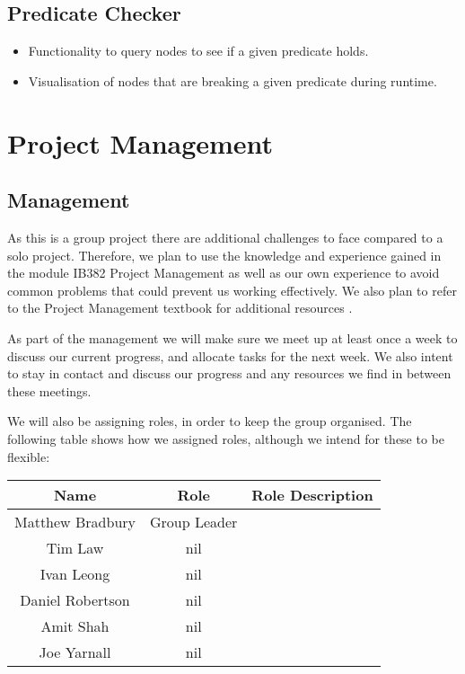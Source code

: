 \documentclass[a4paper]{article}
\begin{document}
\subsection{Predicate Checker}
\begin{itemize}
	\item Functionality to query nodes to see if a given predicate holds.
	\item Visualisation of nodes that are breaking a given predicate during runtime.
\end{itemize}



\section{Project Management}

\subsection{Management}

As this is a group project there are additional challenges to face compared to a solo project. Therefore, we plan to use the knowledge and experience gained in the module IB382 Project Management \cite{?} as well as our own experience to avoid common problems that could prevent us working effectively. We also plan to refer to the Project Management textbook for additional resources \cite{PMTextBook}.

As part of the management we will make sure we meet up at least once a week to discuss our current progress, and allocate tasks for the next week. We also intent to stay in contact and discuss our progress and any resources we find in between these meetings.

We will also be assigning roles, in order to keep the group organised. The following table shows how we assigned roles, although we intend for these to be flexible:

\begin{table}[H]
\centering
	\begin{tabular}{| c | c | c |}
		\hline
		Name & Role & Role Description\\
		\hline
		Matthew Bradbury & Group Leader & ~ \\
		Tim Law & nil & ~ \\
		Ivan Leong & nil & ~ \\
		Daniel Robertson & nil & ~ \\
		Amit Shah & nil & ~ \\
		Joe Yarnall & nil & ~ \\
		\hline
	\end{tabular}
\end{table}
\end{document}
